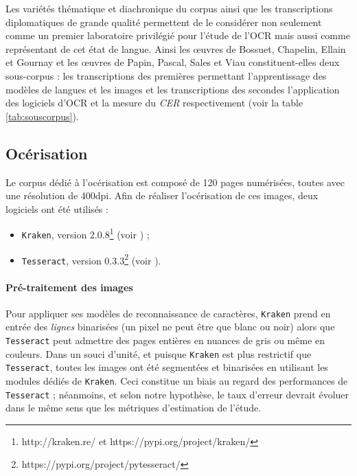 \documentclass[10pt,twoside]{article}
\begin{document}
    Les variétés thématique et diachronique du corpus ainsi que les transcriptions diplomatiques de grande qualité 
    permettent de le considérer non seulement comme un premier laboratoire privilégié pour l'étude 
    de l'OCR mais aussi comme représentant de cet état de langue. Ainsi les \oe{}uvres de Bossuet, Chapelin, 
    Ellain et Gournay et les \oe{}uvres de Papin, Pascal, Sales et Viau constituent-elles deux sous-corpus :
    les transcriptions des premières permettant l'apprentissage des modèles de langues et les images et 
    les transcriptions des secondes l'application des logiciels d'OCR et la mesure du \textit{CER} respectivement 
    (voir la table \ref{tab:souscorpus}).

    \subsection{Océrisation}
    Le corpus dédié à l'océrisation est composé de 120 pages numérisées, toutes avec une résolution de 400dpi. 
    Afin de réaliser l'océrisation de ces images, deux logiciels ont été utilisés :
    \begin{itemize}
      \item \verb!Kraken!, version 2.0.8\footnote{http://kraken.re/ et https://pypi.org/project/kraken/} (voir \cite{Kiessling2019a}) ;
      \item \verb!Tesseract!, version 0.3.3\footnote{https://pypi.org/project/pytesseract/} (voir \cite{Smith2007a}).
    \end{itemize}

        \paragraph{Pré-traitement des images}
        Pour appliquer ses modèles de reconnaissance de caractères, \verb!Kraken! prend en entrée des \textit{lignes}
        binarisées (un pixel ne peut être que blanc ou noir) alors que \verb!Tesseract! peut admettre des pages 
        entières en nuances de gris ou même en couleurs. Dans un souci d'unité, et puisque \verb!Kraken! est plus
        restrictif que \verb!Tesseract!, toutes les images ont été segmentées et binarisées en utilisant les modules
        dédiés de \verb!Kraken!. Ceci constitue un biais au regard des performances de \verb!Tesseract! ; néanmoins, et selon
        notre hypothèse, le taux d'erreur devrait évoluer dans le même sens que les métriques d'estimation de l'étude. 
\end{document}
